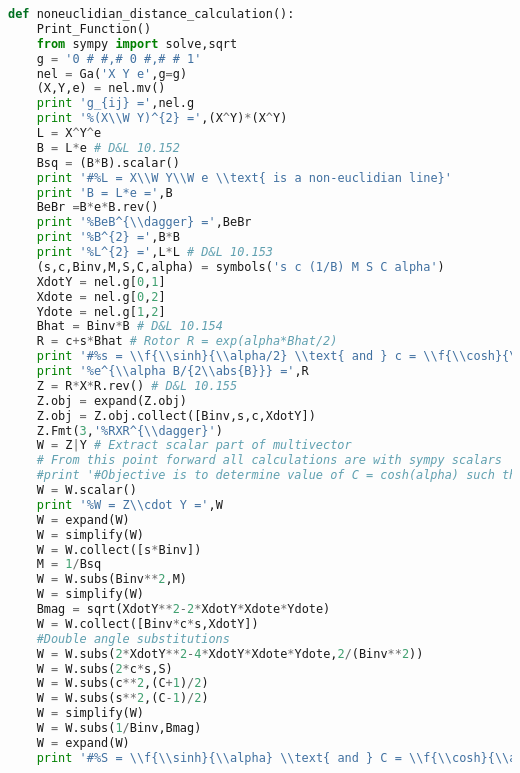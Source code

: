 \documentclass[10pt,fleqn]{report}
\newcommand{\lp}{\left (}
\newcommand{\rp}{\right )}
\newcommand{\abs}[1]{\left |{#1}\right | }
\newcommand{\W}{\wedge}
\newcommand{\f}[2]{{#1}\lp{#2}\rp}
\begin{document}
\begin{lstlisting}[language=Python,showspaces=false,showstringspaces=false,backgroundcolor=\color{gray},frame=single]
def noneuclidian_distance_calculation():
    Print_Function()
    from sympy import solve,sqrt
    g = '0 # #,# 0 #,# # 1'
    nel = Ga('X Y e',g=g)
    (X,Y,e) = nel.mv()
    print 'g_{ij} =',nel.g
    print '%(X\\W Y)^{2} =',(X^Y)*(X^Y)
    L = X^Y^e
    B = L*e # D&L 10.152
    Bsq = (B*B).scalar()
    print '#%L = X\\W Y\\W e \\text{ is a non-euclidian line}'
    print 'B = L*e =',B
    BeBr =B*e*B.rev()
    print '%BeB^{\\dagger} =',BeBr
    print '%B^{2} =',B*B
    print '%L^{2} =',L*L # D&L 10.153
    (s,c,Binv,M,S,C,alpha) = symbols('s c (1/B) M S C alpha')
    XdotY = nel.g[0,1]
    Xdote = nel.g[0,2]
    Ydote = nel.g[1,2]
    Bhat = Binv*B # D&L 10.154
    R = c+s*Bhat # Rotor R = exp(alpha*Bhat/2)
    print '#%s = \\f{\\sinh}{\\alpha/2} \\text{ and } c = \\f{\\cosh}{\\alpha/2}'
    print '%e^{\\alpha B/{2\\abs{B}}} =',R
    Z = R*X*R.rev() # D&L 10.155
    Z.obj = expand(Z.obj)
    Z.obj = Z.obj.collect([Binv,s,c,XdotY])
    Z.Fmt(3,'%RXR^{\\dagger}')
    W = Z|Y # Extract scalar part of multivector
    # From this point forward all calculations are with sympy scalars
    #print '#Objective is to determine value of C = cosh(alpha) such that W = 0'
    W = W.scalar()
    print '%W = Z\\cdot Y =',W
    W = expand(W)
    W = simplify(W)
    W = W.collect([s*Binv])
    M = 1/Bsq
    W = W.subs(Binv**2,M)
    W = simplify(W)
    Bmag = sqrt(XdotY**2-2*XdotY*Xdote*Ydote)
    W = W.collect([Binv*c*s,XdotY])
    #Double angle substitutions
    W = W.subs(2*XdotY**2-4*XdotY*Xdote*Ydote,2/(Binv**2))
    W = W.subs(2*c*s,S)
    W = W.subs(c**2,(C+1)/2)
    W = W.subs(s**2,(C-1)/2)
    W = simplify(W)
    W = W.subs(1/Binv,Bmag)
    W = expand(W)
    print '#%S = \\f{\\sinh}{\\alpha} \\text{ and } C = \\f{\\cosh}{\\alpha}'

\end{lstlisting}
\end{document}
